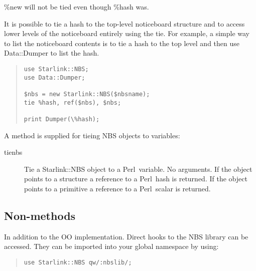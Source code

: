 \documentclass[twoside,11pt]{article}
\newenvironment{myquote}{\begin{quote}\begin{small}}{\end{small}\end{quote}}
\newcommand{\perl}{\xref{\textsf{Perl}}{sun193}{}}
\newcommand{\xref}[3]{#1}
\renewcommand{\_}{\texttt{\symbol{95}}}
\begin{document}
\%new will not be tied even though \%hash was.

It is possible to tie a hash to the top-level noticeboard structure
and to access lower levels of the noticeboard entirely using the
tie. For example, a simple way to list the noticeboard contents
is to tie a hash to the top level and then use Data::Dumper to
list the hash.
\begin{myquote}
\begin{verbatim}
use Starlink::NBS;
use Data::Dumper;

$nbs = new Starlink::NBS($nbsname);
tie %hash, ref($nbs), $nbs;

print Dumper(\%hash);
\end{verbatim}
\end{myquote}

A method is supplied for tieing NBS objects to variables:

\begin{description}

\item[tienbs] \mbox{}

Tie a Starlink::NBS object to a \perl\ variable. No arguments.  If the
object points to a structure a reference to a \perl\ hash is returned.
If the object points to a primitive a reference to a \perl\ scalar is
returned.

\end{description}

\subsection{Non-methods}%

In addition to the OO implementation. Direct hooks to the NBS library
can be accessed. They can be imported into your global namespace by
using:
\begin{myquote}
\begin{verbatim}
use Starlink::NBS qw/:nbslib/;
\end{verbatim}
\end{myquote}
\end{document}
